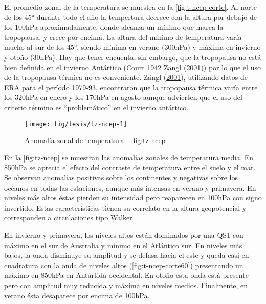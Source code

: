 \documentclass[spanish,a4paper,12p]{book}
\begin{document}
El promedio zonal de la temperatura se muestra en la
\autoref{fig:t-ncep-corte}. Al norte de los 45° durante todo el año la
tempertura decrece con la altura por debajo de los 100hPa
aproximadamente, donde alcanza un mínimo que marca la tropopausa, y
crece por encima. La altura del mínimo de temperatura varía mucho al sur
de los 45°, siendo mínima en verano (300hPa) y máxima en invierno y
otoño (30hPa). Hay que tener encuenta, sin embargo, que la tropopausa no
está bien definida en el invierno Antártico (Court
\protect\hyperlink{ref-Court1942}{1942} Zängl
(\protect\hyperlink{ref-Zangl2001}{2001})) por lo que el uso de la
tropopausa térmica no es conveniente. Zängl
(\protect\hyperlink{ref-Zangl2001}{2001}), utilizando datos de ERA para
el período 1979-93, encontraron que la tropopausa térmica varía entre
los 320hPa en enero y los 170hPa en agosto aunque advierten que el uso
del criterio término es ``problemático'' en el invierno antártico.

\begin{landscape}\begin{figure}

{\centering \texttt{[image: fig/tesis/tz-ncep-1]} 

}

\caption{Anomalía zonal de temperatura. - fig:tz-ncep}\label{fig:tz-ncep}
\end{figure}
\end{landscape}

En la \autoref{fig:tz-ncep} se muestran las anomalías zonales de
temperatura media. En 850hPa se aprecia el efecto del contraste de
temperatura entre el suelo y el mar. Se observan anomalías positivas
sobre los continentes y negativas sobre los océanos en todas las
estaciones, aunque más intensas en verano y primavera. En niveles más
altos éstas pierden su intensidad pero reaparecen en 100hPa con signo
invertido. Estas características tienen su correlato en la altura
geopotencial y corresponden a circulaciones tipo Walker .

En invierno y primavera, los niveles altos están dominados por una QS1
con máximo en el sur de Australia y mínimo en el Atlántico sur. En
niveles más bajos, la onda disminuye su amplitud y se defasa hacia el
este y queda casi en cuadratura con la onda de niveles altos
(\autoref{fig:t-ncep-corte60}) presentando un máximo en 850hPa en
Antártida occidental. En otoño esta onda está presente pero con amplitud
muy reducida y máxima en niveles medios. Finalmente, en verano ésta
desaparece por encima de 100hPa.
\end{document}
